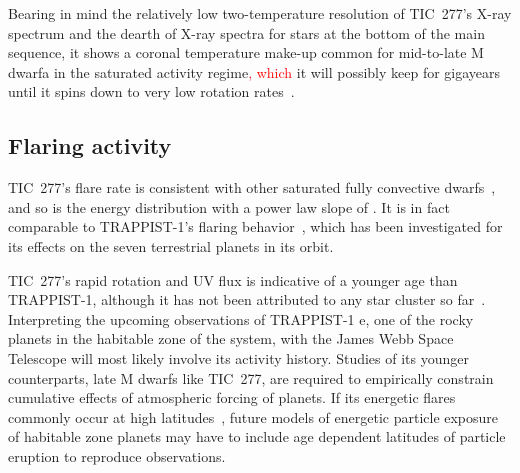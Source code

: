 \documentclass[twocolumn]{aastex631}
\begin{document}
Bearing in mind the relatively low two-temperature resolution of TIC~277's X-ray spectrum and the dearth of X-ray spectra for stars at the bottom of the main sequence, it shows a coronal temperature make-up common for mid-to-late M dwarfa in the saturated activity regime\textcolor{red}{, which} it will possibly keep for gigayears until it spins down to very low rotation rates~\citep{medina2022galactic, engle2023living}. 

\subsection{Flaring activity}
\label{sec:discussion:flares}

TIC~277's flare rate is consistent with other saturated fully convective dwarfs~\citep{medina2020flare, murray2022study}, and so is the energy distribution with a power law slope of \ffdalpha\unskip. It is in fact comparable to TRAPPIST-1's flaring behavior~\citep{paudel2018k2}, which has been investigated for its effects on the seven terrestrial planets in its orbit. 


TIC~277's rapid rotation and UV flux is indicative of a younger age than TRAPPIST-1, although it has not been attributed to any star cluster so far~\citep{schneider2018hazmat}. Interpreting the upcoming observations of TRAPPIST-1 e, one of the rocky planets in the habitable zone of the system, with the James Webb Space Telescope will most likely involve its activity history. Studies of its younger counterparts, late M dwarfs like TIC~277, are required to empirically constrain cumulative effects of atmospheric forcing of planets. If its energetic flares commonly occur at high latitudes~\citep{ilin2021giant}, future models of energetic particle exposure of habitable zone planets may have to include age dependent latitudes of particle eruption to reproduce observations. 
\end{document}
